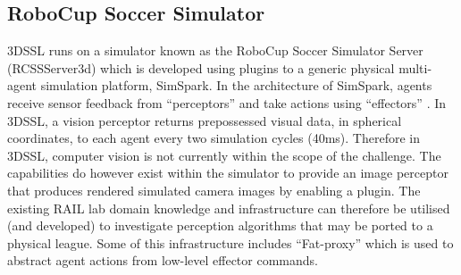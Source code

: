 \documentclass[a4paper,twoside,12pt]{report}
\begin{document}
\subsection{RoboCup Soccer Simulator}

3DSSL runs on a simulator known as the RoboCup Soccer Simulator Server (RCSSServer3d) which is developed using plugins to a generic physical multi-agent simulation platform, SimSpark. In the architecture of SimSpark, agents receive sensor feedback from ``perceptors'' and take actions using ``effectors'' \citep{simspark}. In 3DSSL, a vision perceptor returns prepossessed visual data, in spherical coordinates, to each agent every two simulation cycles (40ms). Therefore in 3DSSL, computer vision is not currently within the scope of the challenge. The capabilities do however exist within the simulator to provide an image perceptor that produces rendered simulated camera images by enabling a plugin. The existing RAIL lab domain knowledge and infrastructure can therefore be utilised (and developed) to investigate perception algorithms that may be ported to a physical league. Some of this infrastructure includes ``Fat-proxy'' which is used to abstract agent actions from low-level effector commands.
\end{document}

